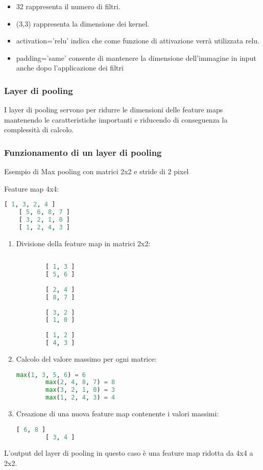 \begin{itemize}
    \item 32 rappresenta il numero di filtri.
    \item (3,3) rappresenta la dimensione dei kernel.
    \item activation='relu' indica che come funzione di attivazione verrà utilizzata relu.
    \item padding='same' consente di mantenere la dimensione dell'immagine in input anche dopo l'applicazione dei filtri
\end{itemize}


\subsubsection{Layer di pooling}
I layer di pooling servono per ridurre le dimensioni delle feature maps mantenendo le caratteristiche importanti e riducendo di conseguenza la complessità di calcolo.
\subsubsection{Funzionamento di un layer di pooling}
Esempio di Max pooling con matrici 2x2 e stride di 2 pixel

Feature map 4x4:
\begin{lstlisting}[language=Python, frame=none]
    [ 1, 3, 2, 4 ]
    [ 5, 6, 8, 7 ]
    [ 3, 2, 1, 0 ]
    [ 1, 2, 4, 3 ]
\end{lstlisting}

\begin{enumerate}
    \item Divisione della feature map in matrici 2x2:
    \begin{lstlisting}[language=Python, frame=none]
    
        [ 1, 3 ]
        [ 5, 6 ]
        
        [ 2, 4 ]
        [ 8, 7 ]
        
        [ 3, 2 ]
        [ 1, 0 ]
        
        [ 1, 2 ]
        [ 4, 3 ]

    \end{lstlisting}
    \item Calcolo del valore massimo per ogni matrice:
    
    \begin{lstlisting}[language=Python, frame=none]
        max(1, 3, 5, 6) = 6
        max(2, 4, 8, 7) = 8
        max(3, 2, 1, 0) = 3
        max(1, 2, 4, 3) = 4
    \end{lstlisting}

    \item Creazione di una nuova feature map contenente i valori massimi:
    \begin{lstlisting}[language=Python, frame=none]
        [ 6, 8 ]
        [ 3, 4 ]
    \end{lstlisting}
\end{enumerate}
L'output del layer di pooling in questo caso è una feature map ridotta da 4x4 a 2x2.

